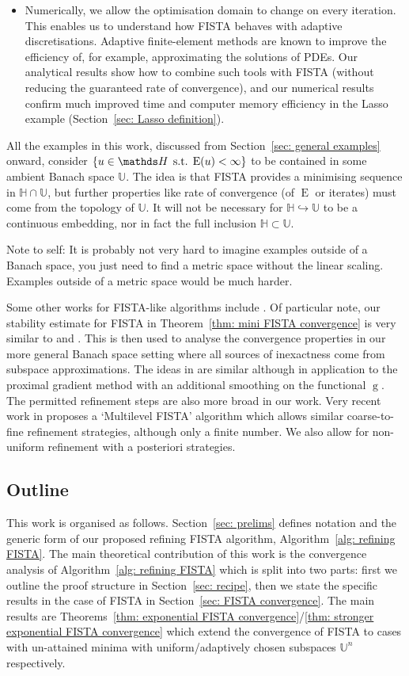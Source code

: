 \documentclass[smallextended]{svjour3}
\let\F\mathds\let\C\mathcal\newcommand{\R}{\F{R}}\newcommand{\A}{\tens{A}}
\newcommand{\op}[1]{\operatorname{#1}}
\newcommand{\1}{\F{1}}
\DeclareMathOperator{\st}{\;s.t.\;}
\newcommand*{\var}[1]{%
	\IfEqCase{#1}{%
		{0}{u}%
		{1}{v}%
		{2}{w}%
	}[u#1]%
}
\newcommand{\todo}[1]{{\color{orange}#1}}
\begin{document}
{\begin{itemize}
		\item Numerically, we allow the optimisation domain to change on every iteration. This enables us to understand how FISTA behaves with adaptive discretisations. Adaptive finite-element methods are known to improve the efficiency of, for example, approximating the solutions of PDEs. Our analytical results show how to combine such tools with FISTA (without reducing the guaranteed rate of convergence), and our numerical results confirm much improved time and computer memory efficiency in the Lasso example (Section~\ref{sec: Lasso definition}).
	\end{itemize}
	All the examples in this work, discussed from Section~\ref{sec: general examples} onward, consider $\{\var0\in\F H\st \op{E}(\var0)<\infty\}$ to be contained in some ambient Banach space $\F{U}$. The idea is that FISTA provides a minimising sequence in $\F H\cap\F U$, but further properties like rate of convergence (of $\op{E}$ or iterates) must come from the topology of $\F{U}$. It will not be necessary for $\F H\hookrightarrow\F U$ to be a continuous embedding, nor in fact the full inclusion $\F H\subset\F U$.

	\todo{Note to self: It is probably not very hard to imagine examples outside of a Banach space, you just need to find a metric space without the linear scaling. Examples outside of a metric space would be much harder.}
}
	
	Some other works for FISTA-like algorithms include \cite{Jiang2012,Villa2013}. Of particular note, our stability estimate for FISTA  in Theorem~\ref{thm: mini FISTA convergence} is very similar to \cite[Prop 2]{Schmidt2011} and \cite[Prop 3.3]{Aujol2015}. This is then used to analyse the convergence properties in our more general Banach space setting where all sources of inexactness come from subspace approximations. The ideas in \cite{Parpas2017} are similar although in application to the proximal gradient method with an additional smoothing on the functional $\op{g}$. The permitted refinement steps are also more broad in our work. Very recent work in \cite{Yu2021} proposes a `Multilevel FISTA' algorithm which allows similar coarse-to-fine refinement strategies, although only a finite number. We also allow for non-uniform refinement with a posteriori strategies.
	
	
	\subsection{Outline}
	This work is organised as follows. Section~\ref{sec: prelims} defines notation and the generic form of our proposed refining FISTA algorithm, Algorithm~\ref{alg: refining FISTA}. The main theoretical contribution of this work is the convergence analysis of Algorithm~\ref{alg: refining FISTA} which is split into two parts: first we outline the proof structure in Section~\ref{sec: recipe}, then we state the specific results in the case of FISTA in Section~\ref{sec: FISTA convergence}. The main results are Theorems~\ref{thm: exponential FISTA convergence}/\ref{thm: stronger exponential FISTA convergence} which extend the convergence of FISTA to cases with un-attained minima with uniform/adaptively chosen subspaces $\F{U}^n$ respectively. 
	
\end{document}
